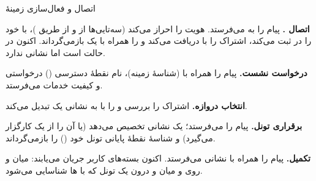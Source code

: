 \documentclass[11pt,a4paper]{article}
\begin{document}
\begin{acnfigure}
  \caption{توالی پیام‌های احراز هویت و رمزنگاری  (\cref{proc:auth}).}
  \label{fig:auth}
\end{acnfigure}

\begin{procedurebox}{اتصال  و فعال‌سازی زمینهٔ }\label{proc:pdp}
\begin{steps}
  \item \textbf{اتصال .}  پیام  را به 
        می‌فرستد.  هویت  را احراز می‌کند (سه‌تایی‌ها از  و از
        طریق )، با  خود را در  ثبت می‌کند، اشتراک
        را با  دریافت می‌کند و  را همراه با یک
         بازمی‌گرداند. اکنون  در حالت  است اما نشانی  ندارد.
  \item \textbf{درخواست نشست.}  پیام  را همراه با
         (شناسهٔ زمینه)، نام نقطهٔ دسترسی () درخواستی و کیفیت خدمات
        می‌فرستد.
  \item \textbf{انتخاب دروازه.}  اشتراک را بررسی و  را با  به
        نشانی یک  تبدیل می‌کند.
  \item \textbf{برقراری تونل.}  پیام   را
        می‌فرستد؛  یک نشانی  تخصیص می‌دهد (یا آن را از یک کارگزار
         می‌گیرد) و شناسهٔ نقطهٔ پایانی تونل خود () را بازمی‌گرداند.
  \item \textbf{تکمیل.}  پیام  را همراه با نشانی
         می‌فرستد. اکنون بسته‌های کاربر جریان می‌یابند: میان  و  روی
         و میان  و  درون یک تونل  که با ها
        شناسایی می‌شود.
\end{steps}
\end{procedurebox}

\begin{acnfigure}
  \caption{اتصال  و سپس فعال‌سازی زمینهٔ  (\cref{proc:pdp}).
  آبی خط‌چین: سیگنالینگ؛ فیروزه‌ای توپر: صفحهٔ کاربر.}
  \label{fig:pdp}
\end{acnfigure}
\end{document}

